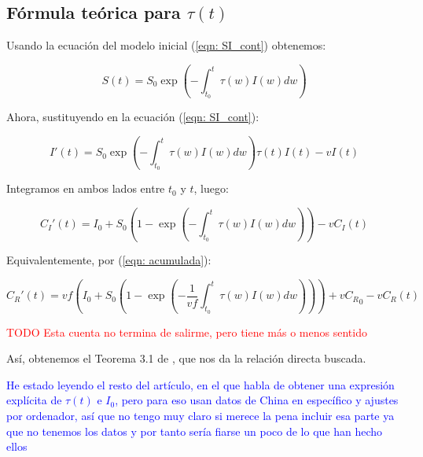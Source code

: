 \subsection{Fórmula teórica para $\tau (t)$}

Usando la ecuación del modelo inicial (\ref{eqn: SI_cont}) obtenemos:

$$S(t) = S_0 \exp{\left( - \int_{t_0}^t \tau(w) I(w) dw \right) } $$ 

Ahora, sustituyendo en la ecuación (\ref{eqn: SI_cont}):

$$I'(t) = S_0 \exp{\left( - \int_{t_0}^t \tau(w) I(w) dw \right) } \tau (t) I(t) -vI(t) $$

Integramos en ambos lados entre $t_0$ y $t$, luego:

$$ C_I'(t) = I_0 + S_0 \left( 1-\exp{\left(- \int_{t_0}^t \tau (w) I(w)dw \right)}\right) -vC_I(t)$$

Equivalentemente, por (\ref{eqn: acumulada}):

$$C_R'(t) = vf\left( I_0 + S_0 \left( 1-\exp{\left(- \frac{1}{vf}\int_{t_0}^t \tau (w ) I(w)dw \right)}\right)\right) +v{C_R}_0 -vC_R(t)$$

\textcolor{red}{TODO Esta cuenta no termina de salirme, pero tiene más o menos sentido}

Así, obtenemos el Teorema 3.1 de \cite{demongeotSIEpidemicModel}, que nos da la relación directa buscada.

\textcolor{blue}{He estado leyendo el resto del artículo, en el que habla de obtener una expresión explícita de $\tau (t)$ e $I_0$, pero para eso usan datos de China en específico y ajustes por ordenador, así que no tengo muy claro si merece la pena incluir esa parte ya que no tenemos los datos y por tanto sería fiarse un poco de lo que han hecho ellos}








